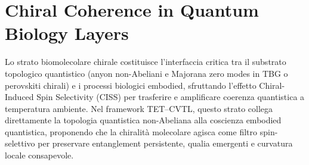 \documentclass[11pt,a4paper]{article}
\theoremstyle{plain}
\theoremstyle{definition}
\begin{document}
\begin{table}[H]
\centering
\scriptsize
\setlength{\tabcolsep}{2pt}
\caption{Confronto propulsori (parte 2: missione, scalabilità, sfide).}
\label{tab:propulsione_comparison_b}
\end{table}




























\vspace{0.6cm}







\section{Chiral Coherence in Quantum Biology Layers}

Lo strato biomolecolare chirale costituisce l'interfaccia critica tra il substrato topologico quantistico (anyon non-Abeliani e Majorana zero modes in TBG o perovskiti chirali) e i processi biologici embodied, sfruttando l'effetto Chiral-Induced Spin Selectivity (CISS) per trasferire e amplificare coerenza quantistica a temperatura ambiente. Nel framework TET–CVTL, questo strato collega direttamente la topologia quantistica non-Abeliana alla coscienza embodied quantistica, proponendo che la chiralità molecolare agisca come filtro spin-selettivo per preservare entanglement persistente, qualia emergenti e curvatura locale consapevole.
\end{document}

